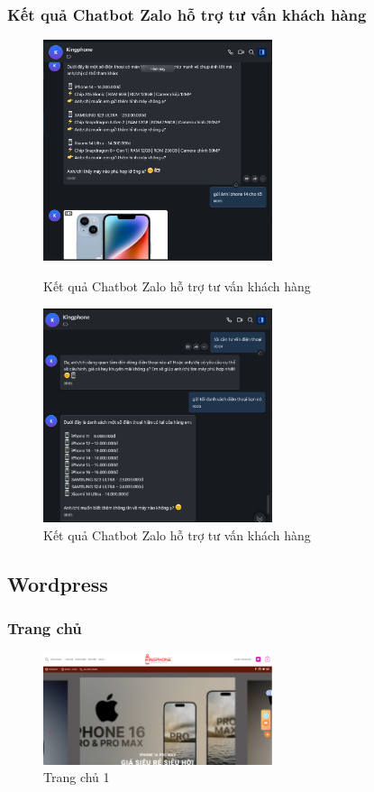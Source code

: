 \subsubsection{Kết quả Chatbot Zalo hỗ trợ tư vấn khách hàng}
\begin{figure}[H]
    \centering
    \includegraphics[width=0.6\textwidth]{img/Picture18.png}
    \caption{Kết quả Chatbot Zalo hỗ trợ tư vấn khách hàng}
    \label{fig:chatbot-ketqua1}
    \includegraphics[width=0.6\textwidth]{img/Picture19.png}
    \caption{Kết quả Chatbot Zalo hỗ trợ tư vấn khách hàng}
    \label{fig:chatbot-ketqua}
\end{figure}
\subsection{Wordpress}

\subsubsection{Trang chủ}
\begin{figure}[H]
    \centering
    \includegraphics[width=0.6\textwidth]{img/trangchu1.png}
    \caption{Trang chủ 1}
    \label{fig:tc}
\end{figure}
